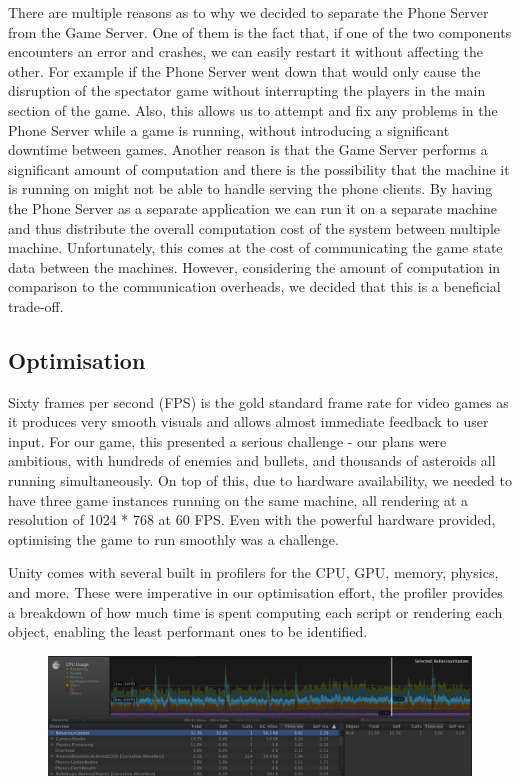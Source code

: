\documentclass[a4paper,11pt]{article}
\begin{document}
There are multiple reasons as to why we decided to separate the Phone Server from the Game Server. One of them is the fact that, if one of the two components encounters an error and crashes, we can easily restart it without affecting the other. For example if the Phone Server went down that would only cause the disruption of the spectator game without interrupting the players in the main section of the game. Also, this allows us to attempt and fix any problems in the Phone Server while a game is running, without introducing a significant downtime between games. Another reason is that the Game Server performs a significant amount of computation and there is the possibility that the machine it is running on might not be able to handle serving the phone clients. By having the Phone Server as a separate application we can run it on a separate machine and thus distribute the overall computation cost of the system between multiple machine. Unfortunately, this comes at the cost of communicating the game state data between the machines. However, considering the amount of computation in comparison to the communication overheads, we decided that this is a beneficial trade-off.

\subsection{Optimisation}
Sixty frames per second (FPS) is the gold standard frame rate for video games as it produces very smooth visuals and allows almost immediate feedback to user input. For our game, this presented a serious challenge - our plans were ambitious, with hundreds of enemies and bullets, and thousands of asteroids all running simultaneously. On top of this, due to hardware availability, we needed to have three game instances running on the same machine, all rendering at a resolution of 1024 * 768 at 60 FPS. Even with the powerful hardware provided, optimising the game to run smoothly was a challenge.

Unity comes with several built in profilers for the CPU, GPU, memory, physics, and more. These were imperative in our optimisation effort, the profiler provides a breakdown of how much time is spent computing each script or rendering each object, enabling the least performant ones to be identified.

\begin{figure}[ht]
	\centering
	\includegraphics[width=\textwidth]{images/profiler}
    \label{fig:profiler}
\end{figure}
\end{document}
